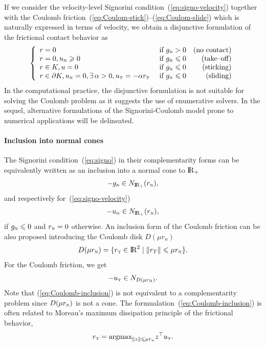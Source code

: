 If we consider the velocity-level Signorini condition~(\ref{eq:signo-velocity}) together with the Coulomb friction~(\ref{eq:Coulom-stick})--(\ref{eq:Coulom-slide}) which is naturally expressed in terms of velocity, we obtain a disjunctive formulation of the frictional contact behavior as
\begin{equation}
  \label{eq:contact-disjunctive}
  \left\{\begin{array}{llr}
      r = 0  &\text{ if } g_{\n} > 0  & \text{(no contact)}\\
      r = 0,  u_\n \geq 0   &\text{ if } g_{\n} \leq 0 & \text{(take--off)} \\
      r \in K, u =0 &\text{ if } g_{\n} \leq 0 & \text{(sticking)}  \\
      r \in \partial K,u _\n=0,  \exists\,\alpha > 0, u_\t = -\alpha r_\t &\text{ if } g_{\n} \leq 0 & \text{(sliding)}  \\
\end{array}\right.
\end{equation}
In the computational practice, the disjunctive formulation is not suitable for  solving the Coulomb problem as it suggests the use of enumerative solvers. In the sequel, alternative formulations of the Signorini-Coulomb model prone to numerical applications will be delineated.

\paragraph{Inclusion into normal cones} The Signorini condition~(\ref{eq:signo}) in their complementarity forms can be equivalently written  as an inclusion into a normal cone to $\mathrm{I\!R}_+$
\begin{equation}
  \label{eq:signo-inclusion}
  - g_\n \in N_{\RR_+}(r_\n),
\end{equation}
and respectively for~(\ref{eq:signo-velocity})
\begin{equation}
  \label{eq:signo-inclusion-velo}
  - u_\n \in N_{\RR_+}(r_\n),
\end{equation}
if $g_{{\hbox{\tiny{N}}}} \leqslant 0$ and $r_{\hbox{\tiny{N}}} =0 $ otherwise. An inclusion form of the Coulomb friction can be also proposed introducing the Coulomb disk $D(\mu r_n)$
\begin{equation}
  \label{eq:diskR}
  D(\mu r_\n) = \{r_\t \in \RR^2\mid \|r_T\| \leq \mu r_\n   \}.
\end{equation}
For the Coulomb friction, we get
\begin{equation}
  \label{eq:Coulomb-inclusion}
  - u_{\t} \in N_{D(\mu r_\n)}.
\end{equation}
Note that (\ref{eq:Coulomb-inclusion}) is not equivalent to a complementarity problem since $D(\mu r_{\hbox{\tiny{N}}})$ is not a cone.  The formualation~(\ref{eq:Coulomb-inclusion}) is often related to Moreau's maximum dissipation principle of the frictional behavior,
\begin{equation}
  \label{eq:moreau-maxprinciple}
  r_\t = \mbox{argmax}_{\|z\| \leq \mu r_n}  z^\top u_\t.
\end{equation}


